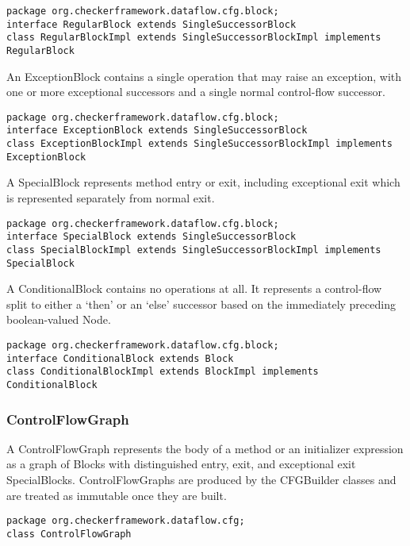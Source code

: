 \begin{verbatim}
package org.checkerframework.dataflow.cfg.block;
interface RegularBlock extends SingleSuccessorBlock
class RegularBlockImpl extends SingleSuccessorBlockImpl implements RegularBlock
\end{verbatim}

An ExceptionBlock contains a single operation that may raise an
exception, with one or more exceptional successors and a single normal
control-flow successor.

\begin{verbatim}
package org.checkerframework.dataflow.cfg.block;
interface ExceptionBlock extends SingleSuccessorBlock
class ExceptionBlockImpl extends SingleSuccessorBlockImpl implements ExceptionBlock
\end{verbatim}

A SpecialBlock represents method entry or exit, including exceptional
exit which is represented separately from normal exit.

\begin{verbatim}
package org.checkerframework.dataflow.cfg.block;
interface SpecialBlock extends SingleSuccessorBlock
class SpecialBlockImpl extends SingleSuccessorBlockImpl implements SpecialBlock
\end{verbatim}

A ConditionalBlock contains no operations at all.  It represents a
control-flow split to either a `then' or an `else' successor based on
the immediately preceding boolean-valued Node.

\begin{verbatim}
package org.checkerframework.dataflow.cfg.block;
interface ConditionalBlock extends Block
class ConditionalBlockImpl extends BlockImpl implements ConditionalBlock
\end{verbatim}



\subsubsection{ControlFlowGraph}
\label{sec:control_flow_graph_class}

A ControlFlowGraph represents the body of a method or an initializer
expression as a graph of Blocks with distinguished entry, exit, and
exceptional exit SpecialBlocks.  ControlFlowGraphs are produced by the
CFGBuilder classes and are treated as immutable once they are built.

\begin{verbatim}
package org.checkerframework.dataflow.cfg;
class ControlFlowGraph
\end{verbatim}

